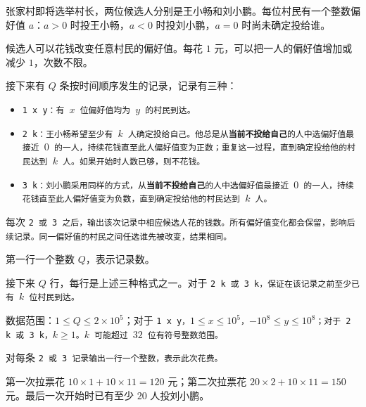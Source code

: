 \Legend
张家村即将选举村长，两位候选人分别是王小畅和刘小鹏。每位村民有一个整数偏好值 $a$：$a>0$ 时投王小畅，$a<0$ 时投刘小鹏，$a=0$ 时尚未确定投给谁。

候选人可以花钱改变任意村民的偏好值。每花 $1$ 元，可以把一人的偏好值增加或减少 $1$，次数不限。

接下来有 $Q$ 条按时间顺序发生的记录，记录有三种：

\begin{itemize}
\item \tt{1 x y}：有 $x$ 位偏好值均为 $y$ 的村民到达。
\item \tt{2 k}：王小畅希望至少有 $k$ 人确定投给自己。他总是从\textbf{当前不投给自己}的人中选偏好值最接近 $0$ 的一人，持续花钱直至此人偏好值变为正数；重复这一过程，直到确定投给他的村民达到 $k$ 人。如果开始时人数已够，则不花钱。
\item \tt{3 k}：刘小鹏采用同样的方式，从\textbf{当前不投给自己}的人中选偏好值最接近 $0$ 的一人，持续花钱直至此人偏好值变为负数，直到确定投给他的村民达到 $k$ 人。
\end{itemize}
每次 \tt{2} 或 \tt{3} 之后，输出该次记录中相应候选人花的钱数。所有偏好值变化都会保留，影响后续记录。同一偏好值的村民之间任选谁先被改变，结果相同。

\Input

第一行一个整数 $Q$，表示记录数。

接下来 $Q$ 行，每行是上述三种格式之一。对于 \tt{2 k} 或 \tt{3 k}，保证在该记录之前至少已有 $k$ 位村民到达。

数据范围：$1\le Q\le 2\times 10^5$；对于 \tt{1 x y}，$1\le x\le 10^5$，$-10^8\le y\le 10^8$；对于 \tt{2 k} 或 \tt{3 k}，$k\ge 1$。$k$ 可能超过 $32$ 位有符号整数范围。

\Output

对每条 \tt{2} 或 \tt{3} 记录输出一行一个整数，表示此次花费。

\Examples

\begin{example}
\end{example}

\Notes

第一次拉票花 $10\times 1+10\times 11=120$ 元；第二次拉票花 $20\times 2+10\times 11=150$ 元。最后一次开始时已有至少 $20$ 人投刘小鹏。

